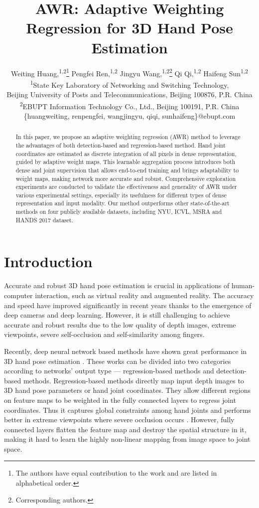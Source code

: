 \documentclass[letterpaper]{article} \usepackage{aaai20}  \usepackage{times}  \usepackage{helvet} \usepackage{courier}  \usepackage[hyphens]{url}  \usepackage{graphicx} \usepackage{amsmath}
\title{AWR: Adaptive Weighting Regression for 3D Hand Pose Estimation}
\author{
    Weiting Huang,\textsuperscript{\rm 1,2}\thanks{The authors have equal contribution to the work and are listed in alphabetical order.} 
    Pengfei Ren,\textsuperscript{\rm 1,2}\printfnsymbol{1} 
    Jingyu Wang,\textsuperscript{\rm 1,2}\thanks{Corresponding authors.} 
    Qi Qi,\textsuperscript{\rm 1,2}\printfnsymbol{2} 
    Haifeng Sun\textsuperscript{\rm 1,2}\printfnsymbol{2} \\
    \textsuperscript{\rm 1}State Key Laboratory of Networking and Switching Technology, \\ Beijing University of  Posts and Telecommunications, Beijing 100876, P.R. China \\
    \textsuperscript{\rm 2}EBUPT Information Technology Co., Ltd., Beijing 100191, P.R. China \\
    \{huangweiting, renpengfei, wangjingyu, qiqi, sunhaifeng\}@ebupt.com
}
\begin{document}
\maketitle

\begin{abstract}
In this paper, we propose an adaptive weighting regression (AWR) method to leverage the advantages of both detection-based and regression-based method. Hand joint coordinates are estimated as discrete integration of all pixels in dense representation, guided by adaptive weight maps. This learnable aggregation process introduces both dense and joint supervision that allows end-to-end training and brings adaptability to weight maps, making network more accurate and robust. Comprehensive exploration experiments are conducted to validate the effectiveness and generality of AWR under various experimental settings, especially its usefulness for different types of dense representation and input modality. Our method outperforms other state-of-the-art methods on four publicly available datasets, including NYU, ICVL, MSRA and HANDS 2017 dataset. 

\end{abstract}


\section{Introduction}

Accurate and robust 3D hand pose estimation is crucial in applications of human-computer interaction, such as virtual reality and augmented reality. The accuracy and speed have improved significantly in recent years thanks to the emergence of deep cameras and deep learning. However, it is still challenging to achieve accurate and robust results due to the low quality of depth images, extreme viewpoints,  severe self-occlusion and self-similarity among fingers.

\parskip=0pt

Recently, deep neural network based methods have shown great performance in 3D hand pose estimation \cite{nyu,p2p,srn,ren,pose,v2v,dense3d,a2j,pixelwise,3dcnn}. These works can be divided into two categories according to networks' output type — regression-based methods and detection-based methods. Regression-based methods directly map input depth images to 3D hand pose parameters or hand joint coordinates. They allow different regions on feature maps to be weighted in the fully connected layers to regress joint coordinates. Thus it captures global constraints among hand joints and performs better in extreme viewpoints where severe occlusion occurs \cite{vanora}. However, fully connected layers flatten the feature map and destroy the spatial structure in it, making it hard to learn the highly non-linear mapping from image space to joint space. 
\end{document}
